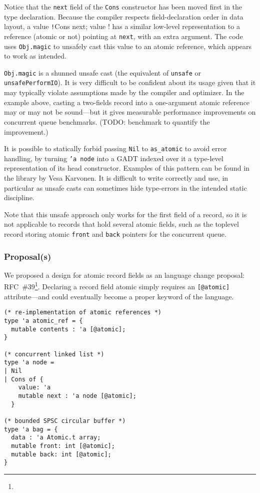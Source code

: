 Notice that the \texttt{next} field of the \texttt{Cons} constructor has been moved first in the type declaration.
Because the \OCaml compiler respects field-declaration order in data layout, a value \texttt!Cons { next; value }! has a similar low-level representation to a reference (atomic or not) pointing at \texttt{next}, with an extra argument.
The code uses \texttt{Obj.magic} to unsafely cast this value to an atomic reference, which appears to work as intended.

\texttt{Obj.magic} is a shunned unsafe cast (the \OCaml equivalent of \texttt{unsafe} or \texttt{unsafePerformIO}).
It is very difficult to be confident about its usage given that it may typically violate assumptions made by the \OCaml compiler and optimizer.
In the example above, casting a two-fields record into a one-argument atomic reference may or may not be sound---but it gives measurable performance improvements on concurrent queue benchmarks. (TODO: benchmark to quantify the improvement.)

It is possible to statically forbid passing \texttt{Nil} to \texttt{as_atomic} to avoid error handling, by turning \texttt{'a node} into a GADT indexed over it a type-level representation of its head constructor.
Examples of this pattern can be found in the \Kcas library by Vesa Karvonen.
It is difficult to write correctly and use, in particular as unsafe casts can sometimes hide type-errors in the intended static discipline.

Note that this unsafe approach only works for the first field of a record, so it is not applicable to records that hold several atomic fields, such as the toplevel record storing atomic \texttt{front} and \texttt{back} pointers for the concurrent queue.

\subsubsection{Proposal(s)}

We proposed a design for atomic record fields as an \OCaml language change proposal: RFC~\#39\footnote{}.
Declaring a record field atomic simply requires an \texttt{[@atomic]} attribute---and could eventually become a proper keyword of the language.

\begin{verbatim}
(* re-implementation of atomic references *)
type 'a atomic_ref = {
  mutable contents : 'a [@atomic];
}

(* concurrent linked list *)
type 'a node =
| Nil
| Cons of {
    value: 'a
    mutable next : 'a node [@atomic];
  }

(* bounded SPSC circular buffer *)
type 'a bag = {
  data : 'a Atomic.t array;
  mutable front: int [@atomic];
  mutable back: int [@atomic];
}
\end{verbatim}

